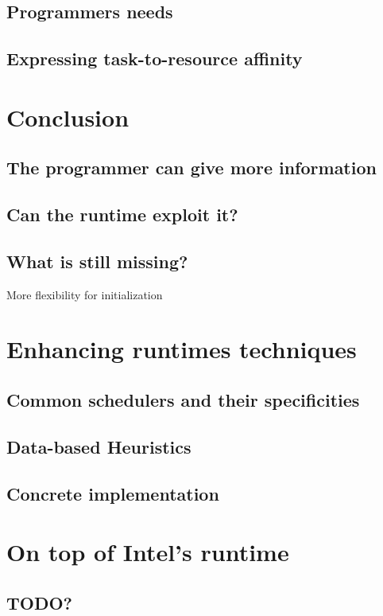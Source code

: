 \subsection{Programmers needs}
\subsection{Expressing task-to-resource affinity}

\section{Conclusion}
\subsection{The programmer can give more information}
\subsection{Can the runtime exploit it?}
\subsection{What is still missing?}
More flexibility for initialization

\section{Enhancing runtimes techniques}
\subsection{Common schedulers and their specificities}
\subsection{Data-based Heuristics}
\subsection{Concrete implementation}

\section{On top of Intel's runtime}
\subsection{TODO?}




